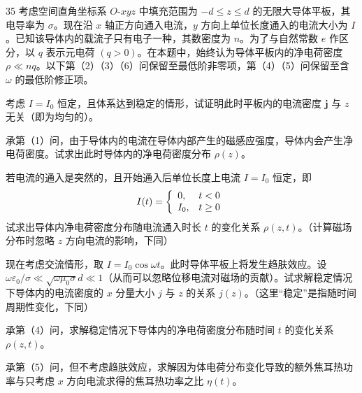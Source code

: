 
\begin{problem}[2026年博知汇BWPhO][通电平板中的电荷密度]{35}
    考虑空间直角坐标系 $O$-$xyz$ 中填充范围为 $-d \leq z \leq d$ 的无限大导体平板，其电导率为 $\sigma$。现在沿 $x$ 轴正方向通入电流，$y$ 方向上单位长度通入的电流大小为 $I$。已知该导体内的载流子只有电子一种，其数密度为 $n$。为了与自然常数 $e$ 作区分，以 $q$ 表示元电荷 $(q > 0)$。在本题中，始终认为导体平板内的净电荷密度 $\rho \ll nq$。以下第（2）（3）（6）问保留至最低阶非零项，第（4）（5）问保留至含 $\omega$ 的最低阶修正项。
    \begin{subproblem}
        考虑 $I = I_0$ 恒定，且体系达到稳定的情形，试证明此时平板内的电流密度 $\pmb{j}$ 与 $z$ 无关（即为均匀的）。
    \end{subproblem}
    \begin{subproblem}
        承第（1）问，由于导体内的电流在导体内部产生的磁感应强度，导体内会产生净电荷密度。试求出此时导体内的净电荷密度分布 $\rho(z)$。
    \end{subproblem}
    \begin{subproblem}
        若电流的通入是突然的，且开始通入后单位长度上电流 $I = I_{0}$ 恒定，即
        \begin{equation}
            I (t) = \left\{ \begin{array}{l l} 0, & t <   0 \\ I _ {0}, & t \geq 0 \end{array} \right.
        \end{equation}
        试求出导体内净电荷密度分布随电流通入时长 $t$ 的变化关系 $\rho (z,t)$。（计算磁场分布时忽略 $z$ 方向电流的影响，下同）
    \end{subproblem}
    \begin{subproblem}
        现在考虑交流情形，取 $I = I_0\cos \omega t$。此时导体平板上将发生趋肤效应。设 $\omega \varepsilon_0 / \sigma \ll \sqrt{\omega \mu_0 \sigma} d \ll 1$（从而可以忽略位移电流对磁场的贡献）。试求解稳定情况下导体内的电流密度的 $x$ 分量大小 $j$ 与 $z$ 的关系 $j(z)$。（这里“稳定”是指随时间周期性变化，下同）
    \end{subproblem}
    \begin{subproblem}
        承第（4）问，求解稳定情况下导体内的净电荷密度分布随时间 $t$ 的变化关系 $\rho (z,t)$。
    \end{subproblem}
    \begin{subproblem}
        承第（5）问，但不考虑趋肤效应，求解因为体电荷分布变化导致的额外焦耳热功率与只考虑 $x$ 方向电流求得的焦耳热功率之比 $\eta(t)$。
    \end{subproblem}
\end{problem}
